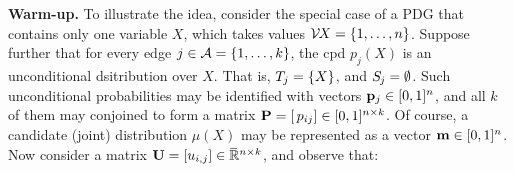 \documentclass[twoside]{article}
\begin{document}
\textbf{Warm-up.}
To illustrate the idea, consider the special case of a PDG that
contains only one variable $X$, which takes values $\mathcal V\mskip-2mu X = \{1, \ldots, n\}$. 
Suppose further that for every edge $j \in \mathcal A = \{1, \ldots, k\}$, the cpd $p_j(X)$ is an unconditional dsitribution over $X$.
That is, $\Tgt j = \{ X \}$, and $\Src j = \emptyset$.
Such unconditional probabilities may be identified with vectors $\mathbf{p}_j \in [0,1]^n$, and all $k$ of them may conjoined to form a 
matrix $\mathbf{P} = [\,p_{ij}] \in [0,1]^{n \times k}$.
Of course, a candidate (joint) distribution $\mu(X)$
may be represented as a vector $\mathbf{m} \in [0,1]^n$. 
%
Now consider a matrix $\mathbf{U} = [u_{i,j}] \in \mskip1mu\overline{\mskip-1mu\mathbb R\!}\,^{n \times k}$,
and observe that:
\end{document}
